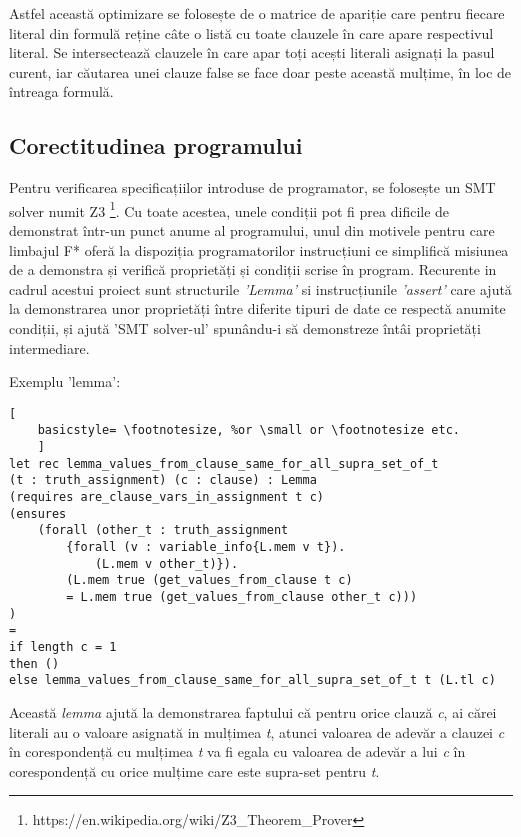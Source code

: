 Astfel această optimizare se folosește de o matrice de apariție care pentru fiecare literal din formulă reține câte o listă cu toate clauzele în care apare respectivul literal.  \newline  Se intersectează clauzele în care apar toți acești literali asignați la pasul curent, iar  \newline  căutarea unei clauze false se face doar peste această mulțime, în loc de întreaga  \newline formulă.

\subsection{Corectitudinea programului}

Pentru verificarea specificațiilor introduse de programator, se folosește un SMT solver numit Z3 \footnote{https://en.wikipedia.org/wiki/Z3\_Theorem\_Prover}.
Cu toate acestea, unele condiții pot fi prea dificile de demonstrat într-un punct anume al programului, unul din motivele pentru care limbajul F* oferă la dispoziția programatorilor instrucțiuni ce simplifică misiunea de a demonstra și \newline verifică proprietăți și condiții scrise în program. Recurente in cadrul acestui proiect sunt structurile \textit{'Lemma'} si instrucțiunile \textit{'assert'} care ajută la demonstrarea unor proprietăți între diferite tipuri de date ce respectă anumite condiții, și ajută 'SMT solver-ul' spunându-i să demonstreze întâi proprietăți intermediare.

Exemplu 'lemma':
\begin{lstlisting}[
	basicstyle= \footnotesize, %or \small or \footnotesize etc.
	]
let rec lemma_values_from_clause_same_for_all_supra_set_of_t
(t : truth_assignment) (c : clause) : Lemma
(requires are_clause_vars_in_assignment t c)
(ensures 
	(forall (other_t : truth_assignment
		{forall (v : variable_info{L.mem v t}). 
			(L.mem v other_t)}).
		(L.mem true (get_values_from_clause t c) 
		= L.mem true (get_values_from_clause other_t c)))
)
= 
if length c = 1 
then ()
else lemma_values_from_clause_same_for_all_supra_set_of_t t (L.tl c)

\end{lstlisting}

\newpage

Această \textit{lemma} ajută la demonstrarea faptului că pentru orice clauză \textit{c}, ai cărei literali au o valoare asignată in mulțimea \textit{t}, atunci valoarea de adevăr a clauzei \textit{c} în corespondență cu mulțimea \textit{t} va fi egala cu valoarea de adevăr a lui \textit{c} în corespondență cu orice mulțime care este supra-set pentru \textit{t}.

